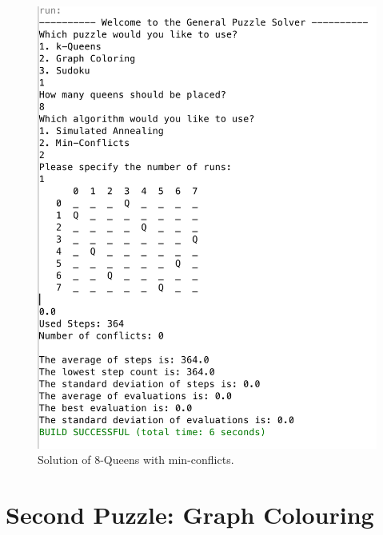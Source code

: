 \documentclass{scrartcl}
\begin{document}
  \begin{figure}[!htbp]
 \includegraphics[width=1.0\linewidth]{graphics/queens-mc.png}
\caption{Solution of 8-Queens with min-conflicts.}\label{fig:queens-mc}
 \end{figure}

\pagebreak

\section{Second Puzzle: Graph Colouring}
\end{document}
